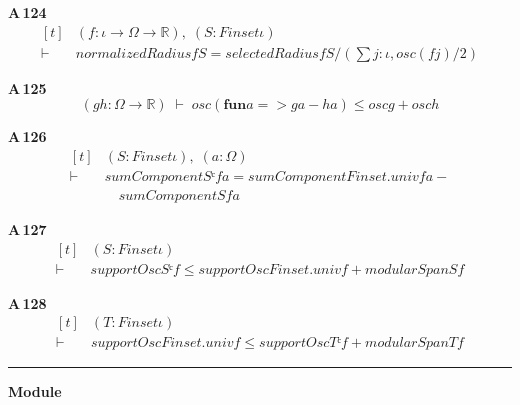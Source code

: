 \noindent\textbf{A\,124}\quad{}
{\footnotesize\[ \begin{aligned}[t]
&(\mathit{f} : \iota \to \Omega \to \mathbb{R} ),\; (\mathit{S} : \mathit{Finset} \iota )\\
\vdash\;&\mathit{normalizedRadius} \mathit{f} \mathit{S} = \mathit{selectedRadius} \mathit{f} \mathit{S} / (\textstyle\sum \mathit{j} : \iota , \mathit{osc} (\mathit{f} \mathit{j}) / 2)
\end{aligned} \]}

\noindent\textbf{A\,125}\quad{}
{\footnotesize\[ (\mathit{g} \mathit{h} : \Omega \to \mathbb{R} ) \;\vdash\; \mathit{osc} (\mathbf{fun} \mathit{a} => \mathit{g} \mathit{a} - \mathit{h} \mathit{a}) \leq \mathit{osc} \mathit{g} + \mathit{osc} \mathit{h} \]}

\noindent\textbf{A\,126}\quad{}
{\footnotesize\[ \begin{aligned}[t]
&(\mathit{S} : \mathit{Finset} \iota ),\; (\mathit{a} : \Omega )\\
\vdash\;&\mathit{sumComponent} \mathit{Sᶜ} \mathit{f} \mathit{a} = \mathit{sumComponent} \mathit{Finset}.\mathit{univ} \mathit{f} \mathit{a} -\\
&\quad \mathit{sumComponent} \mathit{S} \mathit{f} \mathit{a}
\end{aligned} \]}

\noindent\textbf{A\,127}\quad{}
{\footnotesize\[ \begin{aligned}[t]
&(\mathit{S} : \mathit{Finset} \iota )\\
\vdash\;&\mathit{supportOsc} \mathit{Sᶜ} \mathit{f} \leq \mathit{supportOsc} \mathit{Finset}.\mathit{univ} \mathit{f} + \mathit{modularSpan} \mathit{S} \mathit{f}
\end{aligned} \]}

\noindent\textbf{A\,128}\quad{}
{\footnotesize\[ \begin{aligned}[t]
&(\mathit{T} : \mathit{Finset} \iota )\\
\vdash\;&\mathit{supportOsc} \mathit{Finset}.\mathit{univ} \mathit{f} \leq \mathit{supportOsc} \mathit{Tᶜ} \mathit{f} + \mathit{modularSpan} \mathit{T} \mathit{f}
\end{aligned} \]}

\vspace{4pt}\noindent\rule{\columnwidth}{0.4pt}\par\vspace{2pt}
\noindent\textbf{Module }\par\vspace{3pt}

